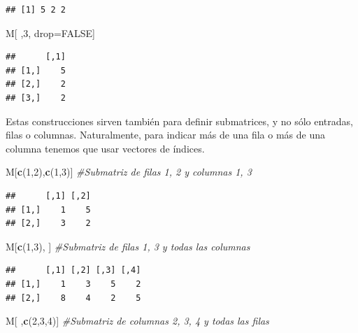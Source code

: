 \documentclass[]{book}
\newenvironment{Shaded}{\begin{snugshade}}{\end{snugshade}}
\newcommand{\CommentTok}[1]{\textcolor[rgb]{0.56,0.35,0.01}{\textit{#1}}}
\newcommand{\DecValTok}[1]{\textcolor[rgb]{0.00,0.00,0.81}{#1}}
\newcommand{\KeywordTok}[1]{\textcolor[rgb]{0.13,0.29,0.53}{\textbf{#1}}}
\newcommand{\NormalTok}[1]{#1}
\newcommand{\OtherTok}[1]{\textcolor[rgb]{0.56,0.35,0.01}{#1}}
\theoremstyle{definition}
\theoremstyle{definition}
\theoremstyle{definition}
\theoremstyle{remark}
\begin{document}
\begin{verbatim}
## [1] 5 2 2
\end{verbatim}

\begin{Shaded}
\begin{Highlighting}[]
\NormalTok{M[ ,}\DecValTok{3}\NormalTok{, drop=}\OtherTok{FALSE}\NormalTok{]}
\end{Highlighting}
\end{Shaded}

\begin{verbatim}
##      [,1]
## [1,]    5
## [2,]    2
## [3,]    2
\end{verbatim}

Estas construcciones sirven también para definir submatrices, y no sólo entradas, filas o columnas. Naturalmente, para indicar más de una fila o más de una columna tenemos que usar vectores de índices.

\begin{Shaded}
\begin{Highlighting}[]
\NormalTok{M[}\KeywordTok{c}\NormalTok{(}\DecValTok{1}\NormalTok{,}\DecValTok{2}\NormalTok{),}\KeywordTok{c}\NormalTok{(}\DecValTok{1}\NormalTok{,}\DecValTok{3}\NormalTok{)] }\CommentTok{#Submatriz de filas 1, 2 y columnas 1, 3}
\end{Highlighting}
\end{Shaded}

\begin{verbatim}
##      [,1] [,2]
## [1,]    1    5
## [2,]    3    2
\end{verbatim}

\begin{Shaded}
\begin{Highlighting}[]
\NormalTok{M[}\KeywordTok{c}\NormalTok{(}\DecValTok{1}\NormalTok{,}\DecValTok{3}\NormalTok{), ] }\CommentTok{#Submatriz de filas 1, 3 y todas las columnas}
\end{Highlighting}
\end{Shaded}

\begin{verbatim}
##      [,1] [,2] [,3] [,4]
## [1,]    1    3    5    2
## [2,]    8    4    2    5
\end{verbatim}

\begin{Shaded}
\begin{Highlighting}[]
\NormalTok{M[ ,}\KeywordTok{c}\NormalTok{(}\DecValTok{2}\NormalTok{,}\DecValTok{3}\NormalTok{,}\DecValTok{4}\NormalTok{)] }\CommentTok{#Submatriz de columnas 2, 3, 4 y todas las filas}
\end{Highlighting}
\end{Shaded}
\end{document}

